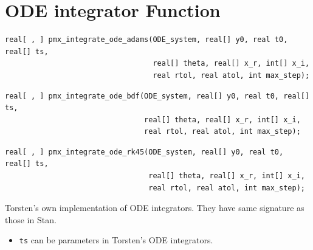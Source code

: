 \documentclass[11pt, reqno, oneside]{amsbook}
\numberwithin{equation}{chapter}
\numberwithin{figure}{chapter}
\numberwithin{table}{chapter}
\theoremstyle{remark}
\begin{document}
\section{ODE  integrator Function}
\label{sec:org381feb7}
\begin{verbatim}
real[ , ] pmx_integrate_ode_adams(ODE_system, real[] y0, real t0, real[] ts,
                                  real[] theta, real[] x_r, int[] x_i,
                                  real rtol, real atol, int max_step);
\end{verbatim}
\begin{verbatim}
real[ , ] pmx_integrate_ode_bdf(ODE_system, real[] y0, real t0, real[] ts,
                                real[] theta, real[] x_r, int[] x_i,
                                real rtol, real atol, int max_step);
\end{verbatim}
\begin{verbatim}
real[ , ] pmx_integrate_ode_rk45(ODE_system, real[] y0, real t0, real[] ts,
                                 real[] theta, real[] x_r, int[] x_i,
                                 real rtol, real atol, int max_step);
\end{verbatim}
Torsten's own implementation of ODE integrators. They have same
signature as those in Stan.
\begin{itemize}
\item \texttt{ts} can be parameters in Torsten's ODE integrators.
\end{itemize}
\end{document}
